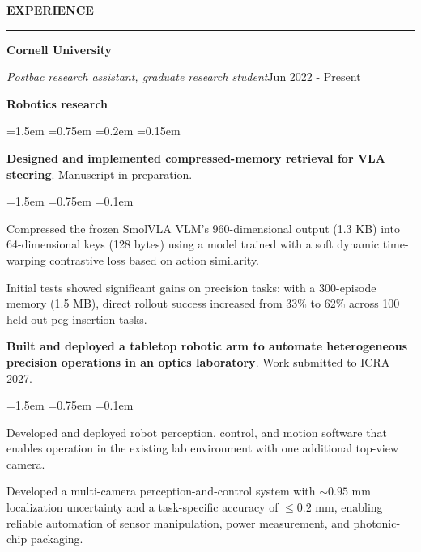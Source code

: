 \documentclass{article}
\newenvironment{rSection}[1]{%
  \smallskip
  \MakeUppercase{\textbf{#1}}
  \smallskip
  \hrule
  \begin{list}{}{%
    \setlength{\leftmargin}{0em}
    \setlength{\topsep}{0.25em}
    \setlength{\partopsep}{0pt}
    \setlength{\parsep}{0pt}
    \setlength{\itemsep}{0.15em}
  }
  \item[]
}{%
  \end{list}
}
\newcommand{\institution}[1]{%
  {\fontsize{11}{13}\selectfont\textbf{#1}}\par\vspace{-0.1em}%
}
\newcommand{\role}[2]{%
  \textit{#1}\hfill #2\par\vspace{-0.3em}%
}
\newcommand{\category}[1]{%
  \vspace{0.2em}\textbf{#1}\par\vspace{-0.2em}%
}
\newenvironment{experienceItems}{%
  \begin{list}{\makebox[0pt][c]{$\cdot$}}{%
    \leftmargin=1.5em
    \labelwidth=0pt
    \labelsep=0.75em
    \topsep=0.2em
    \partopsep=0pt
    \parsep=0pt
    \itemsep=0.15em
  }
}{%
  \end{list}
  \vspace{0.2em}
}
\newenvironment{details}{%
  \begin{list}{\makebox[0pt][c]{$\cdot$}}{%
    \leftmargin=1.5em
    \labelwidth=0pt
    \labelsep=0.75em
    \topsep=0.1em
    \partopsep=0pt
    \parsep=0pt
    \itemsep=0pt
  }
}{%
  \end{list}
}
\begin{document}
\begin{rSection}{Experience}

\institution{Cornell University}
\role{Postbac research assistant, graduate research student}{Jun 2022 - Present}

\category{Robotics research}
\begin{experienceItems}
\item \textbf{Designed and implemented compressed-memory retrieval for VLA steering}. Manuscript in preparation.
\begin{details}
  \item Compressed the frozen SmolVLA VLM's 960-dimensional output (1.3 KB) into 64-dimensional keys (128 bytes) using a model trained with a soft dynamic time-warping contrastive loss based on action similarity.
  \item Initial tests showed significant gains on precision tasks: with a 300-episode memory (1.5 MB), direct rollout success increased from 33\% to 62\% across 100 held-out peg-insertion tasks.
\end{details}
\item \textbf{Built and deployed a tabletop robotic arm to automate heterogeneous precision operations in an optics laboratory}. Work submitted to ICRA 2027.
\begin{details}
  \item Developed and deployed robot perception, control, and motion software that enables operation in the existing lab environment with one additional top-view camera.
  \item Developed a multi-camera perception-and-control system with $\sim\!0.95$ mm localization uncertainty and a task-specific accuracy of $\leq\!0.2$ mm, enabling reliable automation of sensor manipulation, power measurement, and photonic-chip packaging.
\end{details}
\end{experienceItems}


\end{rSection}
\end{document}
